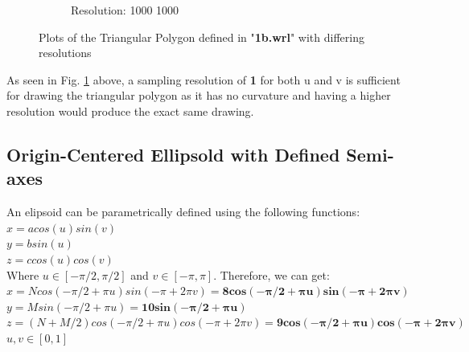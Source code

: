 \documentclass[acmlarge,nonacm=true]{acmart}
\begin{document}
\begin{figure}[H]
\begin{subfigure}{.33\textwidth}
		\caption{Resolution: 1000 1000}
	  \end{subfigure}
	\caption{Plots of the Triangular Polygon defined in "\textbf{1b.wrl}" with differing resolutions}
	\label{fig:1b}
\end{figure}

As seen in Fig. \ref{fig:1b} above, a sampling resolution of \textbf{1} for both u and v is 
sufficient for drawing the triangular polygon as it has no curvature and having a higher resolution would
produce the exact same drawing.


\subsection{Origin-Centered Ellipsold with Defined Semi-axes}
An elipsoid can be parametrically defined using the following functions:\\
\(x = acos(u)sin(v)\)\\
\(y = bsin(u)\)\\
\(z = ccos(u)cos(v)\)\\
Where \(u \in [-\pi/2, \pi/2]\) and \(v \in [-\pi, \pi]\). Therefore, we can get:\\
\(x = Ncos(-\pi/2 + \pi u)sin(-\pi + 2\pi v) = \mathbf{8cos(-\pi/2 + \pi u)sin(-\pi + 2\pi v)}\)\\
\(y = Msin(-\pi/2 + \pi u) = \mathbf{10sin(-\pi/2 + \pi u)}\)\\
\(z = (N+M/2)cos(-\pi/2 + \pi u)cos(-\pi + 2\pi v) = \mathbf{9cos(-\pi/2 + \pi u)cos(-\pi + 2\pi v)}\)\\
\(u,v \in [0,1]\)
\end{document}
